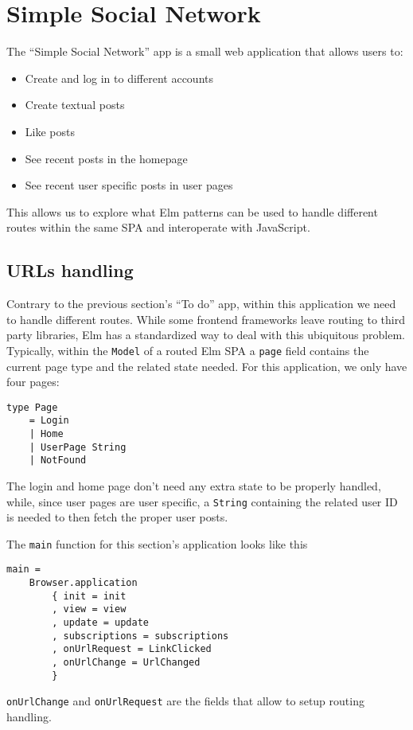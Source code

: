\section{Simple Social Network}
The ``Simple Social Network'' app is a small web application that allows users to:
\begin{itemize}
    \item Create and log in to different accounts
    \item Create textual posts
    \item Like posts
    \item See recent posts in the homepage
    \item See recent user specific posts in user pages
\end{itemize}
This allows us to explore what Elm patterns can be used to handle different routes within the same SPA and interoperate with JavaScript.

\subsection{URLs handling}
Contrary to the previous section's ``To do'' app, within this application we need to handle different routes. While some frontend frameworks leave routing to third party libraries, Elm has a standardized way to deal with this ubiquitous problem.\\

Typically, within the \texttt{Model} of a routed Elm SPA a \texttt{page} field contains the current page type and the related state needed. For this application, we only have four pages:
\begin{verbatim}
type Page
    = Login
    | Home
    | UserPage String
    | NotFound
\end{verbatim}
The login and home page don't need any extra state to be properly handled, while, since user pages are user specific, a \texttt{String} containing the related user ID is needed to then fetch the proper user posts.

The \texttt{main} function for this section's application looks like this

\begin{verbatim}
main =
    Browser.application
        { init = init
        , view = view
        , update = update
        , subscriptions = subscriptions
        , onUrlRequest = LinkClicked
        , onUrlChange = UrlChanged
        }
\end{verbatim}

\texttt{onUrlChange} and \texttt{onUrlRequest} are the fields that allow to setup routing handling.\\

